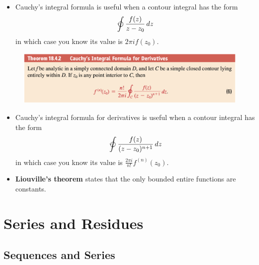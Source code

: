 \documentclass{article}
\begin{document}
\begin{itemize}
  \item Cauchy's integral formula is useful when a contour integral has the form \[\varointctrclockwise \frac{f(z)}{z - z_0} \,d z\] in which case you know its value is $2 \pi i f(z_0)$.
\end{itemize}

\begin{figure}[H]
  \centering
  \includegraphics[width=\textwidth]{cauchys-integral-formula-for-derivatives}
\end{figure}

\begin{itemize}
  \item Cauchy's integral formula for derivatives is useful when a contour integral has the form \[\varointctrclockwise \frac{f(z)}{(z - z_0)^{n + 1}} \,d z\] in which case you know its value is $\frac{2 \pi i}{n!} f^{(n)}(z_0)$.

  \item \textbf{Liouville's theorem} states that the only bounded entire functions are constants.
\end{itemize}

\section{Series and Residues}

\subsection{Sequences and Series}
\end{document}
